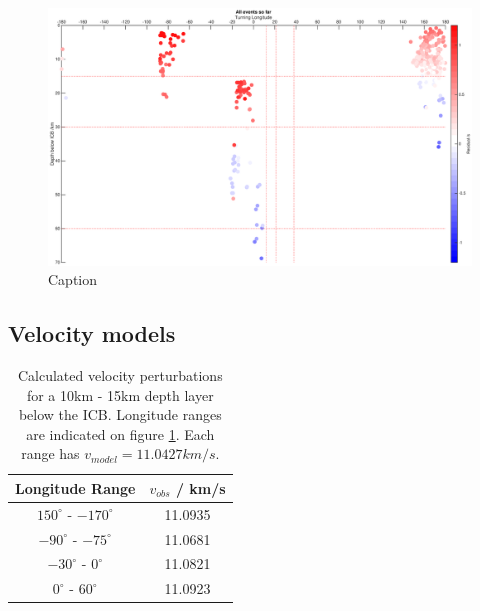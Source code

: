 \documentclass[11pt,a4paper]{article}
\begin{document}
\begin{figure}
	\centering
	\includegraphics[width=\textwidth]{figures/all_longitude}
	\caption{Caption}
	\label{fig:All longitude}
\end{figure}

\subsection{Velocity models}

\begin{table}
\centering
\begin{tabular}{| c | c |}
	\hline
	Longitude Range			& $v_{obs}$ / km/s	\\ \hline \hline
	$150^{\circ}$ - $-170^{\circ}$	& 11.0935			\\ \hline
	$-90^{\circ}$ - $-75^{\circ}$	& 11.0681			\\ \hline
	$-30^{\circ}$ - $0^{\circ}$		& 11.0821			\\ \hline
	$0^{\circ}$ - $60^{\circ}$		& 11.0923			\\
	\hline
\end{tabular}
\caption{Calculated velocity perturbations for a 10km - 15km depth layer below the ICB. Longitude ranges are indicated on figure \ref{fig:All longitude}. Each range has $v_{model} = 11.0427 km/s$.}
\label{tab:Velocity models}
\end{table}
	

\appendix
\end{document}
